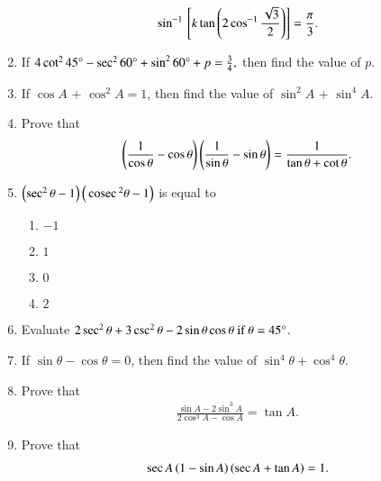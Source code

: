 \begin{enumerate}[label=\thesubsection.\arabic*,ref=\thesubsection.\theenumi,itemsep=1pt]
	\begin {align*}
	\sin^{-1} {}\left[k \tan \left( 2\cos^{-1} \frac {\sqrt{3}}{2}\right)\right]= \frac{\pi}{3}.
\end {align*}
\hfill{}
\item If $4 \cot^{2}45\degree-\sec^{2}60\degree+\sin^{2}60\degree+p=\frac{3}{4},$ then find the value of $p$.
\hfill{}\item If $\cos A$ + $\cos^{2}A = 1$, then find the value of $\sin^{2}A$ + $\sin^{4}A$.
\hfill{}
\item Prove that 
\begin{align*}
	\left(\frac{1}{\cos\theta}-\cos\theta\right) \left(\frac{1}{\sin\theta}-\sin\theta\right) = \frac{1}{\tan\theta + \cot\theta}
.\end{align*}
\hfill{}
\item $ \left(\sec^2 \theta - 1\right)\left(\,\text{cosec}\,^2 \theta - 1\right)$
is equal to
\begin{multicols}{4}
\begin{enumerate}
\item $-1$
\item $1$
\item $0$
\item $2$
\end{enumerate}
\end{multicols}
\hfill{}\item
Evaluate 
$2\sec^2\theta + 3\csc^2\theta - 2\sin\theta\cos\theta  \ \text{if} \ \theta = 45\degree
$.
\hfill{}\item 
If 
$\sin\theta - \cos\theta = 0$,  then find the value of $\sin^4\theta + \cos^4\theta$.
\hfill{}\item
Prove that \begin{align*} \frac{\sin{A}-2\sin^3{A}}{2\cos^3{A}-\cos{A}}=\tan{A} .\end{align*}
\hfill{}\item
Prove that \begin{align*} \sec{A\ensuremath{\left(1-\sin{A}\right)}\ensuremath{\left(\sec{A}+\tan{A}\right)}}=1. \end{align*}
\hfill{}
\end{enumerate}
